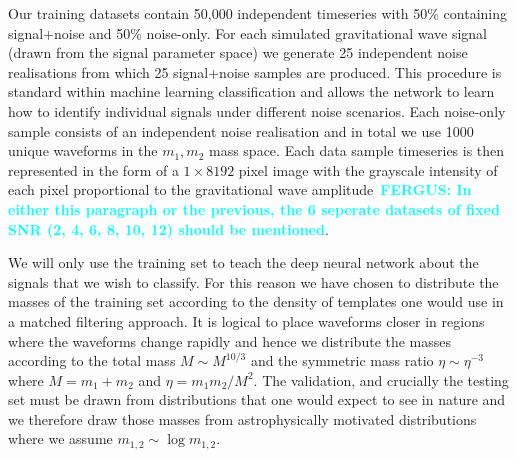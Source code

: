 \documentclass[%
 amsmath,amssymb,
 aps,
 twocolumn,
 prl,
 reprint,
floatfix,
]{revtex4-1}
\newcommand{\fergus}[1]{\textbf{\textcolor{cyan}{FERGUS: #1}}}
\begin{document}
%
%
Our training datasets contain 50,000 independent timeseries with 50\% containing
signal+noise and 50\% noise-only. For each simulated gravitational wave signal
(drawn from the signal parameter space) we generate 25 independent noise
realisations from which 25 signal+noise samples are produced. This procedure is
standard within machine learning classification and allows the network to learn
how to identify individual signals under different noise scenarios. Each
noise-only sample consists of an independent noise realisation and in total we
use 1000 unique waveforms in the $m_{1},m_{2}$ mass space. Each data sample
timeseries is then represented in the form of a $1 \times 8192$ pixel image
with the grayscale intensity of each pixel proportional to the gravitational
wave amplitude~\fergus{In either this paragraph or the previous, the 6 seperate datasets of fixed SNR (2, 4, 6, 8, 10, 12) should be mentioned}.

%
%
We will only use the training set to teach the deep neural network about the
signals that we wish to classify. For this reason we have chosen to distribute
the masses of the training set according to the density of templates one would
use in a matched filtering approach. It is logical to place waveforms closer in
regions where the waveforms change rapidly and hence we distribute the masses
according to the total mass $M\sim M^{10/3}$ and the symmetric mass ratio
$\eta\sim \eta^{-3}$ where $M=m_{1}+m_{2}$ and $\eta=m_{1}m_{2}/M^{2}$. The
validation, and crucially the testing set must be drawn from distributions that
one would expect to see in nature and we therefore draw those masses from
astrophysically motivated distributions where we assume $m_{1,2}\sim
\log{m_{1,2}}$.   
\end{document}
